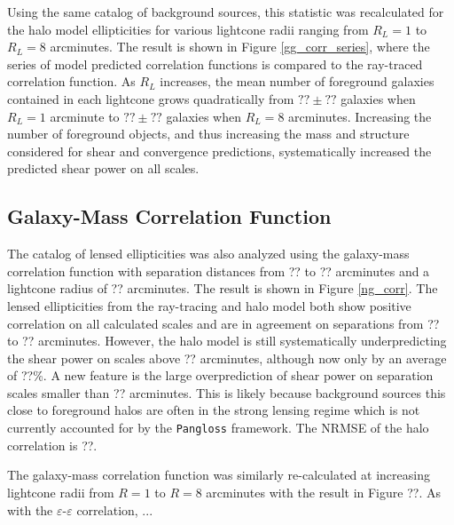 \documentclass[%
 reprint,
 amsmath,amssymb,
 aps,nofootinbib
]{revtex4-1}
\begin{document}
Using the same catalog of background sources, this statistic was recalculated for the halo model ellipticities for various lightcone radii ranging from $R_L=1$ to $R_L=8$ arcminutes. The result is shown in Figure \ref{gg_corr_series}, where the series of model predicted correlation functions is compared to the ray-traced correlation function. As $R_L$ increases, the mean number of foreground galaxies contained in each lightcone grows quadratically from ${??\pm??}$ galaxies when $R_L=1$ arcminute to ${??\pm??}$ galaxies when $R_L=8$ arcminutes. Increasing the number of foreground objects, and thus increasing the mass and structure considered for shear and convergence predictions, systematically increased the predicted shear power on all scales. 



\subsection{Galaxy-Mass Correlation Function}

The catalog of lensed ellipticities was also analyzed using the galaxy-mass correlation function with separation distances from ?? to ?? arcminutes and a lightcone radius of ?? arcminutes. The result is shown in Figure \ref{ng_corr}. The lensed ellipticities from the ray-tracing and halo model both show positive correlation on all calculated scales and are in agreement on separations from ?? to ?? arcminutes. However, the halo model is still systematically underpredicting the shear power on scales above ?? arcminutes, although now only by an average of ??\%. A new feature is the large overprediction of shear power on separation scales smaller than ?? arcminutes. This is likely because background sources this close to foreground halos are often in the strong lensing regime which is not currently accounted for by the \texttt{Pangloss} framework. The NRMSE of the halo correlation is ??.

The galaxy-mass correlation function was similarly re-calculated at increasing lightcone radii from $R=1$ to $R=8$ arcminutes with the result in Figure ??. As with the $\varepsilon$-$\varepsilon$ correlation, ...
\end{document}
